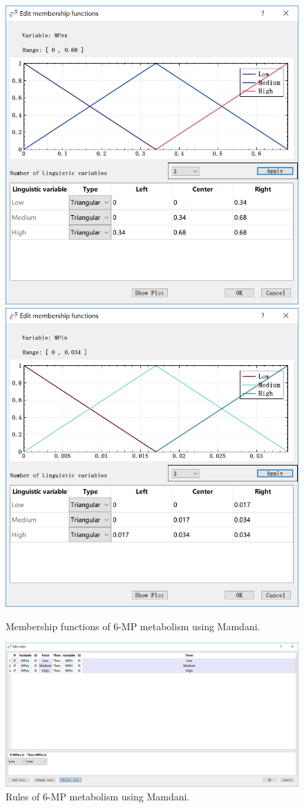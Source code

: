 \documentclass[journal,a4paper,onecolumn]{article}
\begin{document}
\begin{figure}[!hbt]
	\begin{center}
		\includegraphics[width=0.45\columnwidth]{fig57}
		\includegraphics[width=0.45\columnwidth]{fig58}
		\caption{Membership functions of 6-MP metabolism using Mamdani.}
		\label{fig:Membership functions of 6-MP metabolism using Mamdani.}
	\end{center}
\end{figure}
\begin{figure}[!hbt]
	\begin{center}
		\includegraphics[width=\columnwidth]{fig59}
		\caption{Rules of 6-MP metabolism using Mamdani.}
		\label{fig:Rules of 6-MP metabolism using Mamdani.}
	\end{center}
\end{figure}
\end{document}
